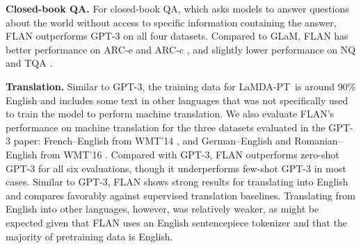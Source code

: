 \documentclass{article} \usepackage{iclr2022_conference,times}
\newcommand{\battleshipgrey}[1]{{\color{battleshipgrey}{#1}}}
\newcommand{\flan}{FLAN}
\newcommand{\baselm}{LaMDA-PT}
\begin{document}
\textbf{Closed-book QA.}
For closed-book QA, which asks models to answer questions about the world without access to specific information containing the answer, \flan{} outperforms GPT-3 on all four datasets.
Compared to GLaM, \flan{} has better performance on ARC-e and ARC-c \citep{clark2018think}, and slightly lower performance on NQ \citep{orqa,kwiatkowski2019natural} and TQA \citep{JoshiTriviaQA2017}.

\textbf{Translation.}
Similar to GPT-3, the training data for \baselm\ is around 90\% English and includes some text in other languages that was not specifically used to train the model to perform machine translation. 
We also evaluate \flan's performance on machine translation for the three datasets evaluated in the GPT-3 paper: French--English from WMT'14 \citep{wmt14}, and German--English and Romanian--English from WMT'16 \citep{wmt16}. 
Compared with GPT-3, \flan{} outperforms zero-shot GPT-3 for all six evaluations, though it underperforms few-shot GPT-3 in most cases.
Similar to GPT-3, \flan{} shows strong results for translating into English and compares favorably against supervised translation baselines.
Translating from English into other languages, however, was relatively weaker, as might be expected given that \flan{} uses an English sentencepiece tokenizer and that the majority of pretraining data is English.
 

\newcommand{\flanvalspaced}[4]{
\makecell[l]{\hspace{#4mm}#1\vspace{-1.5mm}\\
{\hspace{#4mm}\battleshipgrey{\tiny std=#2}}\vspace{0.3mm}\\
\hspace{#4mm}{#3}}}
\newcommand{\flanval}[3]{\flanvalspaced{#1}{#2}{#3}{0}}

\newcommand{\gptvalspaced}[4]{\makecell[l]{\hspace{#4mm}#1\vspace{-0.4mm}\\{\hspace{#4mm}\battleshipgrey{\scriptsize #3}}}}
\newcommand{\gptval}[3]{\gptvalspaced{#1}{#2}{#3}{0}}
\end{document}
